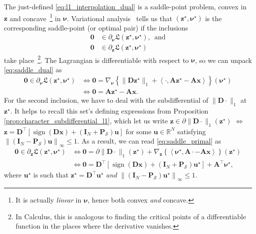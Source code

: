 The just-defined \eqref{eq:l1_interpolation_dual} is a saddle-point problem, convex in $\mathbf{z}$ and concave~\footnote{It is actually \emph{linear} in $\bm{\nu}$, hence both convex \emph{and} concave.} in $\bm{\nu}$. Variational analysis~\cite[Thm. 8.15]{rockafellar2009} tells us that $(\mathbf{z}^\star, \bm{\nu}^\star)$ is the corresponding saddle-point (or optimal pair) if the inclusions
\begin{align}
    \label{eq:saddle_dual} \mathbf{0} & \in \partial_{\bm{\nu}} \mathfrak{L}(\mathbf{z}^\star, \bm{\nu}^\star), \enspace \text{and}\\
    \label{eq:saddle_primal} \mathbf{0} & \in \partial_{\mathbf{z}} \mathfrak{L}(\mathbf{z}^\star, \bm{\nu}^\star)
\end{align}
take place~\footnote{In Calculus, this is analogous to finding the critical points of a differentiable function in the places where the derivative vanishes.}. The Lagrangian is differentiable with respect to $\bm{\nu}$, so we can unpack \eqref{eq:saddle_dual} as
\begin{align*}
    \mathbf{0} \in \partial_{\bm{\nu}} \mathfrak{L}(\mathbf{z}^\star, \bm{\nu}^\star) & \iff \mathbf{0} = \nabla_{\bm{\nu}} \left\{ \| \mathbf{D}\mathbf{z}^\star \|_1 + \left\langle \cdot, \mathbf{A}\mathbf{z}^\star - \mathbf{Ax}\right\rangle \right\} (\bm{\nu}^\star)\\
    & \iff \mathbf{0} = \mathbf{A}\mathbf{z}^\star - \mathbf{Ax}.
\end{align*}
For the second inclusion, we have to deal with the subdifferential of $\|\mathbf{D} \cdot \|_1$ at $\mathbf{z}^\star$. It helps to recall this set's defining expressions from Proposition \ref{prop:character_subdifferential_l1}, which let us write $\mathbf{z} \in \partial \|\mathbf{D} \cdot \|_1 (\mathbf{z}^\star)$ $\iff$ $\mathbf{z} = \mathbf{D}^{\top} \left[ \operatorname{sign} \left ( \mathbf{Dx} \right ) + \left ( \mathbf{I}_N + \mathbf{P}_{\mathcal{S}} \right ) \mathbf{u} \right]$ for some $\mathbf{u} \in \mathbb{R}^{N}$ satisfying $\left\|(\mathbf{I}_N - \mathbf{P}_{\mathcal{S}}) \mathbf{u}\right\|_\infty \leq 1$. As a result, we can read \eqref{eq:saddle_primal} as
\begin{align*}
    \mathbf{0} \in \partial_{\mathbf{z}} \mathfrak{L}(\mathbf{z}^\star, \bm{\nu}^\star) & \iff \mathbf{0} = \partial \|\mathbf{D} \cdot \|_1 (\mathbf{z}^\star) + \nabla_{\mathbf{z}} \left\{ \left\langle \bm{\nu}^\star, \mathbf{A}\cdot - \mathbf{Ax}\right\rangle \right\} (\mathbf{z}^\star)\\
    & \iff \mathbf{0} = \mathbf{D}^{\top} \left[ \operatorname{sign} \left ( \mathbf{Dx} \right ) + \left ( \mathbf{I}_N + \mathbf{P}_{\mathcal{S}} \right ) \mathbf{u}^\star \right] + \mathbf{A}^{\top} \bm{\nu}^\star,
\end{align*}
where $\mathbf{u}^\star$ is such that $\mathbf{z}^\star = \mathbf{D}^\top \mathbf{u}^\star$ \emph{and} $\left\|(\mathbf{I}_N - \mathbf{P}_{\mathcal{S}}) \mathbf{u}^\star \right\|_\infty \leq 1$.

